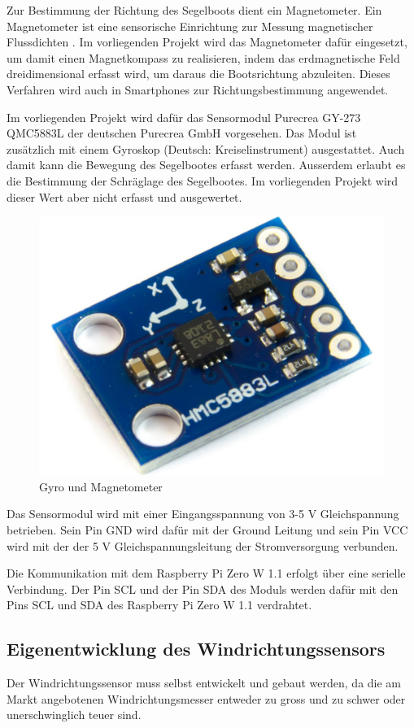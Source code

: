 Zur Bestimmung der Richtung des Segelboots dient ein Magnetometer. Ein Magnetometer ist eine sensorische Einrichtung zur Messung magnetischer Flussdichten \cite{noauthor_magnetometer_2023}. Im vorliegenden Projekt wird das Magnetometer dafür eingesetzt, um damit einen Magnetkompass zu realisieren, indem das erdmagnetische Feld dreidimensional erfasst wird, um daraus die Bootsrichtung abzuleiten. Dieses Verfahren wird auch in Smartphones zur Richtungsbestimmung angewendet.

Im vorliegenden Projekt wird dafür das Sensormodul Purecrea GY-273 QMC5883L der deutschen Purecrea GmbH vorgesehen. Das Modul ist \\ zusätzlich mit einem Gyroskop (Deutsch: Kreiselinstrument) ausgestattet. Auch damit kann die Bewegung des Segelbootes erfasst werden. Ausserdem erlaubt es die Bestimmung der Schräglage des Segelbootes. Im vorliegenden Projekt wird dieser Wert aber nicht erfasst und ausgewertet.

\begin{figure}[H]
    \centering
    \includegraphics[width=0.5\linewidth]{assets/magnetometer.jpg}
    \caption{Gyro und Magnetometer}
\end{figure}

Das Sensormodul wird mit einer Eingangsspannung von 3-5 V Gleichspannung betrieben. Sein Pin GND wird dafür mit der Ground Leitung und sein Pin VCC wird mit der der 5 V Gleichspannungsleitung der Stromversorgung verbunden.

Die Kommunikation mit dem Raspberry Pi Zero W 1.1 erfolgt über eine serielle Verbindung. Der Pin SCL und der Pin SDA des Moduls werden dafür mit den Pins SCL und SDA des Raspberry Pi Zero W 1.1 verdrahtet.

\subsection{Eigenentwicklung des Windrichtungssensors}
Der Windrichtungssensor muss selbst entwickelt und gebaut werden, da die am Markt angebotenen Windrichtungsmesser entweder zu gross und zu schwer oder unerschwinglich teuer sind.

